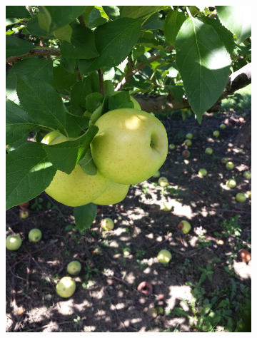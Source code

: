  


\begin{figure}[htb]
\centering
\begin{subfigure}[t]{0.3\textwidth}
    \includegraphics[width=\textwidth]{figures/active_counting/appleview1.jpg}
\end{subfigure}\quad \begin{subfigure}[t]{0.3\textwidth}

\end{subfigure}
\end{figure}
